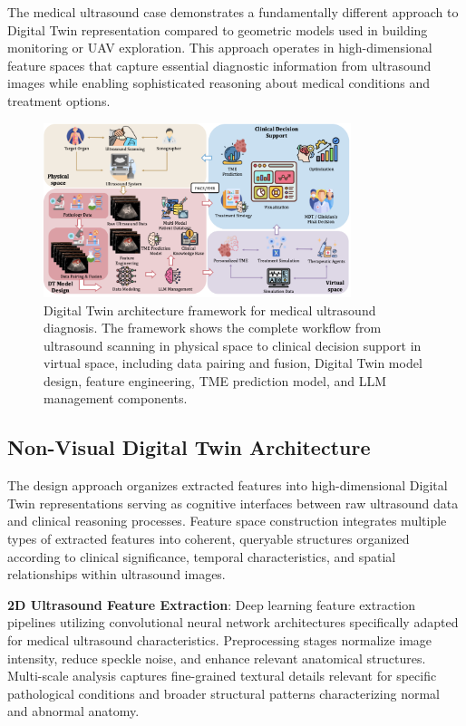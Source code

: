The medical ultrasound case demonstrates a fundamentally different approach to Digital Twin representation compared to geometric models used in building monitoring or UAV exploration. This approach operates in high-dimensional feature spaces that capture essential diagnostic information from ultrasound images while enabling sophisticated reasoning about medical conditions and treatment options.

\begin{figure}[htbp]
\centering
\includegraphics[width=0.8\textwidth]{figures/Med/med_framework.png}
\caption{Digital Twin architecture framework for medical ultrasound diagnosis. The framework shows the complete workflow from ultrasound scanning in physical space to clinical decision support in virtual space, including data pairing and fusion, Digital Twin model design, feature engineering, TME prediction model, and LLM management components.}
\label{fig:med_framework}
\end{figure}

\subsection{Non-Visual Digital Twin Architecture}

The design approach organizes extracted features into high-dimensional Digital Twin representations serving as cognitive interfaces between raw ultrasound data and clinical reasoning processes. Feature space construction integrates multiple types of extracted features into coherent, queryable structures organized according to clinical significance, temporal characteristics, and spatial relationships within ultrasound images.

\textbf{2D Ultrasound Feature Extraction}: Deep learning feature extraction pipelines utilizing convolutional neural network architectures specifically adapted for medical ultrasound characteristics. Preprocessing stages normalize image intensity, reduce speckle noise, and enhance relevant anatomical structures. Multi-scale analysis captures fine-grained textural details relevant for specific pathological conditions and broader structural patterns characterizing normal and abnormal anatomy.

